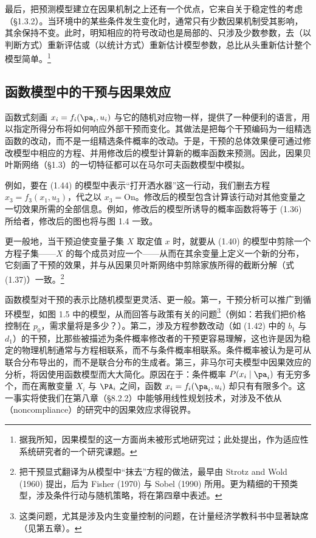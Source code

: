 最后，把预测模型建立在因果机制之上还有一个优点，它来自关于稳定性的考虑（\S 1.3.2）。当环境中的某些条件发生变化时，通常只有少数因果机制受其影响，其余保持不变。此时，明知相应的符号改动也是局部的、只涉及少数参数，去（以判断方式）重新评估或（以统计方式）重新估计模型参数，总比从头重新估计整个模型简单。\footnote{据我所知，因果模型的这一方面尚未被形式地研究过；此处提出，作为适应性系统研究者的一个研究课题。}

\subsection{函数模型中的干预与因果效应}

函数式刻画 $x_i=f_i(\pa_i,u_i)$ 与它的随机对应物一样，提供了一种便利的语言，用以指定所得分布将如何响应外部干预而变化。其做法是把每个干预编码为一组精选函数的改动，而不是一组精选条件概率的改动。于是，干预的总体效果便可通过修改模型中相应的方程、并用修改后的模型计算新的概率函数来预测。因此，因果贝叶斯网络（\S 1.3）的一切特征都可以在马尔可夫函数模型中模拟。

例如，要在 \textup{(1.44)} 的模型中表示“打开洒水器”这一行动，我们删去方程 $x_3=f_3(x_1,u_3)$，代之以 $x_3=\mathrm{On}$。修改后的模型包含计算该行动对其他变量之一切效果所需的全部信息。例如，修改后的模型所诱导的概率函数将等于 \textup{(1.36)} 所给者，修改后的图也将与图 1.4 一致。

更一般地，当干预迫使变量子集 $X$ 取定值 $x$ 时，就要从 \textup{(1.40)} 的模型中剪除一个方程子集——$X$ 的每个成员对应一个——从而在其余变量上定义一个新的分布，它刻画了干预的效果，并与从因果贝叶斯网络中剪除家族所得的截断分解（式 \textup{(1.37)}）一致。\footnote{把干预显式翻译为从模型中“抹去”方程的做法，最早由 Strotz and Wold (1960) 提出，后为 Fisher (1970) 与 Sobel (1990) 所用。更为精细的干预类型，涉及条件行动与随机策略，将在第四章中表述。}

函数模型对干预的表示比随机模型更灵活、更一般。第一，干预分析可以推广到循环模型，如图 1.5 中的模型，从而回答与政策有关的问题\footnote{这类问题，尤其是涉及内生变量控制的问题，在计量经济学教科书中显著缺席（见第五章）。}（例如：若我们把价格控制在 $p_0$，需求量将是多少？）。第二，涉及方程参数改动（如 \textup{(1.42)} 中的 $b_1$ 与 $d_1$）的干预，比那些被描述为条件概率修改者的干预更容易理解，这也许是因为稳定的物理机制通常与方程相联系，而不与条件概率相联系。条件概率被认为是可从联合分布导出的，而不是联合分布的生成者。第三，非马尔可夫模型中因果效应的分析，将因使用函数模型而大大简化。原因在于：条件概率 $P(x_i\mid\pa_i)$ 有无穷多个，而在离散变量 $X_i$ 与 $\PA_i$ 之间，函数 $x_i=f_i(\pa_i,u_i)$ 却只有有限多个。这一事实将使我们在第八章（\S 8.2.2）中能够用线性规划技术，对涉及不依从（noncompliance）的研究中的因果效应求得锐界。

